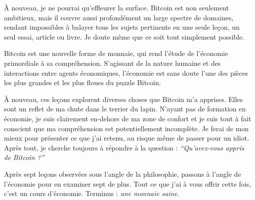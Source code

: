 À nouveau, je ne pourrai qu'effleurer la surface. Bitcoin est non seulement
ambitieux, mais il couvre aussi profondément un large spectre de domaines,
rendant impossibles à balayer tous les sujets pertinents en une seule leçon, un
seul essai, article ou livre. Je doute même que ce soit tout simplement
possible.

Bitcoin est une nouvelle forme de monnaie, qui rend l'étude de l'économie
primordiale à sa compréhension. S'agissant de la nature humaine et des
interactions entre agents économiques, l'économie est sans doute l'une des
pièces les plus grandes et les plus floues du puzzle Bitcoin.

À nouveau, ces leçons explorent diverses choses que Bitcoin m'a apprises. Elles
sont un reflet de ma chute dans le terrier du lapin. N'ayant pas de formation en
économie, je suis clairement en-dehors de ma zone de confort et je suis tout à
fait conscient que ma compréhension est potentiellement incomplète. Je ferai de
mon mieux pour présenter ce que j'ai retenu, au risque même de passer pour un
idiot. Après tout, je cherche toujours à répondre à la question :
\textit{\enquote{Qu'avez-vous appris de Bitcoin ?}}

Après sept leçons observées sous l'angle de la philosophie, passons à l'angle de
l'économie pour en examiner sept de plus. Tout ce que j'ai à vous offrir cette
fois, c'est un cours d'économie. Terminus : \textit{une monnaie saine}.

